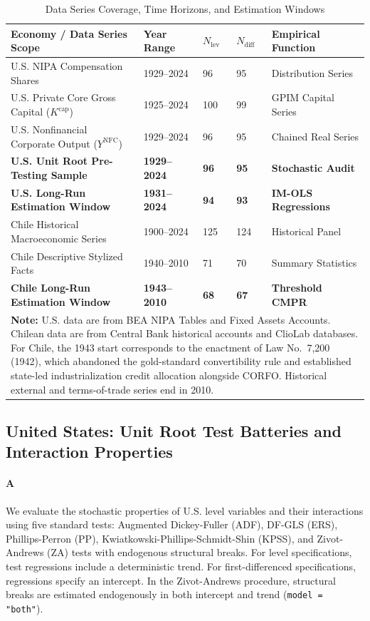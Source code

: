 \begin{table}[h!]
\centering
\small
\caption{Data Series Coverage, Time Horizons, and Estimation Windows}
\label{tab:sample_audit}
\begin{tabular}{p{6.5cm} p{2.2cm} p{1.6cm} p{1.6cm} p{2.5cm}}
\toprule
\textbf{Economy / Data Series Scope} & \textbf{Year Range} & \textbf{$N_{\text{lev}}$} & \textbf{$N_{\text{diff}}$} & \textbf{Empirical Function} \\
\midrule
U.S. NIPA Compensation Shares & 1929--2024 & 96 & 95 & Distribution Series \\
U.S. Private Core Gross Capital ($K^{\text{cap}}$) & 1925--2024 & 100 & 99 & GPIM Capital Series \\
U.S. Nonfinancial Corporate Output ($Y^{\text{NFC}}$) & 1929--2024 & 96 & 95 & Chained Real Series \\
\textbf{U.S. Unit Root Pre-Testing Sample} & \textbf{1929--2024} & \textbf{96} & \textbf{95} & \textbf{Stochastic Audit} \\
\textbf{U.S. Long-Run Estimation Window} & \textbf{1931--2024} & \textbf{94} & \textbf{93} & \textbf{IM-OLS Regressions} \\
\midrule
Chile Historical Macroeconomic Series & 1900--2024 & 125 & 124 & Historical Panel \\
Chile Descriptive Stylized Facts & 1940--2010 & 71 & 70 & Summary Statistics \\
\textbf{Chile Long-Run Estimation Window} & \textbf{1943--2010} & \textbf{68} & \textbf{67} & \textbf{Threshold CMPR} \\
\bottomrule
\multicolumn{5}{p{15.2cm}}{\footnotesize \textbf{Note:} U.S. data are from BEA NIPA Tables and Fixed Assets Accounts. Chilean data are from Central Bank historical accounts and ClioLab databases. For Chile, the 1943 start corresponds to the enactment of Law No.~7,200 (1942), which abandoned the gold-standard convertibility rule and established state-led industrialization credit allocation alongside CORFO. Historical external and terms-of-trade series end in 2010.}
\end{tabular}
\end{table}

\FloatBarrier
\subsection{United States: Unit Root Test Batteries and Interaction Properties}

\paragraph{A}
We evaluate the stochastic properties of U.S. level variables and their interactions using five standard tests: Augmented Dickey-Fuller (ADF), DF-GLS (ERS), Phillips-Perron (PP), Kwiatkowski-Phillips-Schmidt-Shin (KPSS), and Zivot-Andrews (ZA) tests with endogenous structural breaks. For level specifications, test regressions include a deterministic trend. For first-differenced specifications, regressions specify an intercept. In the Zivot-Andrews procedure, structural breaks are estimated endogenously in both intercept and trend (\texttt{model = "both"}).

